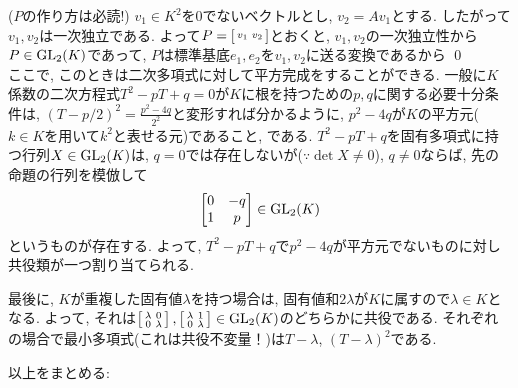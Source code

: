 \prf ($P$の作り方は必読!) $v_1\in K^2$を0でないベクトルとし, $v_2 = Av_1$とする.  したがって$v_1,v_2$は一次独立である. よって$P=\left[\begin{smallmatrix}v_1 & v_2\end{smallmatrix}\right]$とおくと, $v_1,v_2$の一次独立性から$P\in \mathrm{GL}_{2}(K)$であって, $P$は標準基底$e_1,e_2$を$v_1,v_2$に送る変換であるから
\qed \\
ここで,  このときは二次多項式に対して平方完成をすることができる.
一般に$K$係数の二次方程式$T^2 - pT + q = 0$が$K$に根を持つための$p,q$に関する必要十分条件は, $(T-p/2)^2 = \frac{p^2-4q}{2^2}$と変形すれば分かるように, $p^2-4q$が$K$の平方元($k\in K$を用いて$k^2$と表せる元)であること, である.
$T^2 - pT +q$を固有多項式に持つ行列$X\in \mathrm{GL}_{2}(K)$は, $q=0$では存在しないが($\because \det{X} \neq 0$), $q\neq 0$ならば, 先の命題の行列を模倣して
\[
\begin{bmatrix}
0 & -q \\
1 & p
\end{bmatrix} \in \mathrm{GL}_{2}(K)
\]
というものが存在する. よって, $T^2- pT + q$で$p^2-4q$が平方元でないものに対し共役類が一つ割り当てられる. \par
最後に, $K$が重複した固有値$\lambda$を持つ場合は, 固有値和$2\lambda$が$K$に属すので$\lambda\in K$となる. よって, それは$\left[\begin{smallmatrix}\lambda & 0 \\ 0 & \lambda\end{smallmatrix}\right], \left[\begin{smallmatrix}\lambda & 1 \\ 0 & \lambda\end{smallmatrix}\right]\in \mathrm{GL}_{2}(K)$のどちらかに共役である. それぞれの場合で最小多項式(これは共役不変量！)は$T-\lambda$, $(T-\lambda)^2$である.
\par
以上をまとめる:

